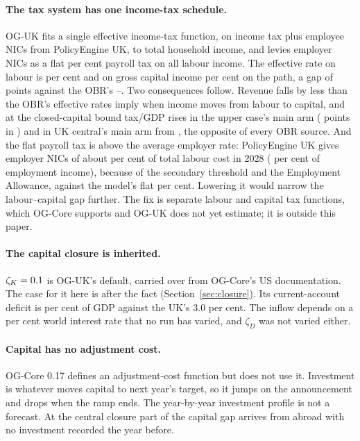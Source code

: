 \paragraph{The tax system has one income-tax schedule.} OG-UK fits a single effective income-tax function, on income tax plus employee NICs from PolicyEngine UK, to total household income, and levies employer NICs as a flat \genTauPayrollPct{} per cent payroll tax on all labour income. The effective rate on labour is \genEffLabourPctCentral{} per cent and on gross capital income \genEffCapitalPctCentral{} per cent on the path, a gap of \genEffWedgePpCentral{} points against the OBR's \genObrWedgeLo--\genObrWedgeHi{}. Two consequences follow. Revenue falls by less than the OBR's effective rates imply when income moves from labour to capital, and at the closed-capital bound tax/GDP rises in the upper case's main arm (\genKorinekMainTaxGdpPpBound{} points in \genHeadYear{}) and in UK central's main arm from \genUkCentralMainTaxFirstPosBound{}, the opposite of every OBR source. And the flat payroll tax is above the average employer rate: PolicyEngine UK \genPolicyengineUkVersion{} gives employer NICs of about \genNicsEmployerOnLabourCostPct{} per cent of total labour cost in 2028 (\genNicsEmployerOnEarningsPct{} per cent of employment income), because of the secondary threshold and the Employment Allowance, against the model's flat \genTauPayrollPct{} per cent. Lowering it would narrow the labour--capital gap further. The fix is separate labour and capital tax functions, which OG-Core supports and OG-UK does not yet estimate; it is outside this paper.

\paragraph{The capital closure is inherited.} $\zeta_K = 0.1{}$ is OG-UK's default, carried over from OG-Core's US documentation. The case for it here is after the fact (Section~\ref{sec:closure}). Its current-account deficit is \genCurrentAccountDeficitBaseCentral{} per cent of GDP against the UK's 3.0 per cent. The inflow depends on a \genWorldRatePct{} per cent world interest rate that no run has varied, and $\zeta_D$ was not varied either.

\paragraph{Capital has no adjustment cost.} OG-Core 0.17 defines an adjustment-cost function but does not use it. Investment is whatever moves capital to next year's target, so it jumps on the announcement and drops when the ramp ends. The year-by-year investment profile is not a forecast. At the central closure part of the \genShockYear{} capital gap arrives from abroad with no investment recorded the year before.

